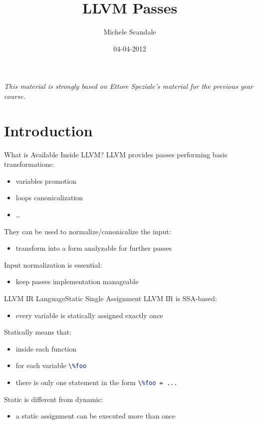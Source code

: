 \documentclass[10pt,mathserif]{beamer}
\author{Michele Scandale}
\institute{Politecnico di Milano}
\date{04-04-2012}
\title{LLVM Passes}
\newcommand{\llvminline}[1]{\lstinline[language=LLVM]!#1!}
\begin{document}
\begin{frame}
\maketitle
\begin{center}
\itshape\scriptsize This material is strongly based on Ettore Speziale's material for the previous year course.
\end{center}
\end{frame}

\section{Introduction}
\begin{frame}{What is Available Inside LLVM?}
LLVM provides passes performing basic transformations:

\begin{itemize}
\item variables promotion
\item loops canonicalization
\item \ldots
\end{itemize}

They can be used to \alert{normalize/canonicalize} the input:

\begin{itemize}
\item transform into a form analyzable for further passes
\end{itemize}

Input normalization is \alert{essential}:

\begin{itemize}
\item keep passes implementation manageable
\end{itemize}
\end{frame}

\begin{frame}{LLVM IR Language}{Static Single Assignment}
LLVM IR is SSA-based:

\begin{itemize}
\item every variable is \alert{statically assigned} exactly \alert{once}
\end{itemize}

Statically means that:

\begin{itemize}
\item inside each function
\item for each variable \llvminline{\%foo}
\item there is only one statement in the form \llvminline{\%foo = ...}
\end{itemize}

Static is different from dynamic:

\begin{itemize}
\item a static assignment can be executed more than once
\end{itemize}
\end{frame}
\end{document}
